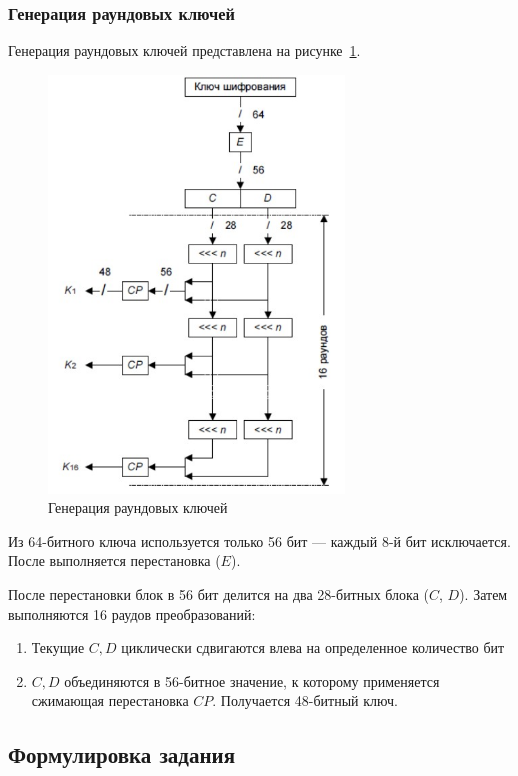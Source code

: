 \documentclass[a4paper, 14pt]{extarticle}
\begin{document}
\subsubsection{Генерация раундовых ключей}
Генерация раундовых ключей представлена на рисунке~\ref{img:1:4}.
\begin{figure}[h]
    \centering
    \includegraphics[width=0.7\textwidth]{./img/S004.jpg}
    \caption{Генерация раундовых ключей}%
    \label{img:1:4}
\end{figure}
Из 64-битного ключа используется только 56 бит --- каждый 8-й бит исключается. После выполняется перестановка ($E$).

После перестановки блок в 56 бит делится на два 28-битных блока ($C$, $D$). Затем выполняются 16 раудов преобразований:
\begin{enumerate}
    \item Текущие $C, D$ циклически сдвигаются влева на определенное количество бит
    \item $C, D$ объединяются в 56-битное значение, к которому применяется сжимающая перестановка $CP$. Получается 48-битный ключ.
\end{enumerate}


\FloatBarrier{}
\subsection{Формулировка задания}
\end{document}
